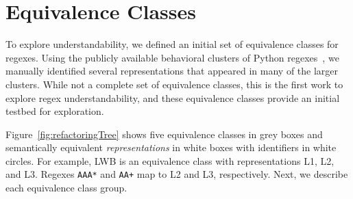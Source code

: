 





\section{Equivalence Classes}
\label{sec:refactoring}
To explore understandability, we defined an initial set of equivalence classes for regexes. 
Using the publicly available behavioral clusters of Python regexes~\cite{chapman2016}, we manually identified several representations that appeared in many of the larger clusters. 
While not a complete set of equivalence classes, this is the first work to explore regex  understandability, and these equivalence classes provide an initial testbed for exploration.

Figure~\ref{fig:refactoringTree} shows five equivalence classes in grey boxes and semantically equivalent \emph{representations} in white boxes with identifiers in white circles. For example, LWB is an equivalence class with representations L1, L2, and L3. Regexes \verb!AAA*! and \verb!AA+!  map to L2 and L3, respectively.
Next, we describe each equivalence class group. 

